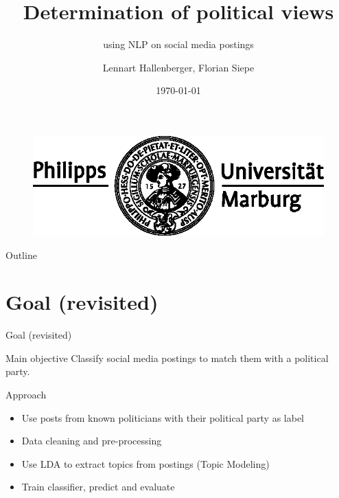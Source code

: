 \documentclass[aspectratio=169,xcolor=dvipsnames]{beamer}
\title[Determination of political views]{Determination of political views}
\subtitle{using NLP on social media postings}
\author[Lennart Hallenberger, Florian Siepe]{Lennart Hallenberger, Florian Siepe}
\institute[] %
{
    Department Mathematics and Computer Science \\
    Philipps University of Marburg
    \vskip 3pt
}
\date{\today} %
\begin{document}
\begin{frame}[plain]
    \titlepage
    \begin{figure}[h]
        \includegraphics[scale=0.5]{images/uni_logo_schwarz.eps}
    \end{figure}
\end{frame}

\begin{frame}{Outline}
    \tableofcontents
\end{frame}

\section{Goal (revisited)}

\begin{frame}{Goal (revisited)}

    \begin{block}{Main objective}
        Classify social media postings to match them with a political party.
    \end{block}
    
    \begin{block}{Approach}
        \begin{itemize}
            \item Use posts from known politicians with their political party as label
            \item Data cleaning and pre-processing
            \item Use LDA to extract topics from postings (Topic Modeling)
            \item Train classifier, predict and evaluate
        \end{itemize}
    \end{block}
\end{frame}
\end{document}
